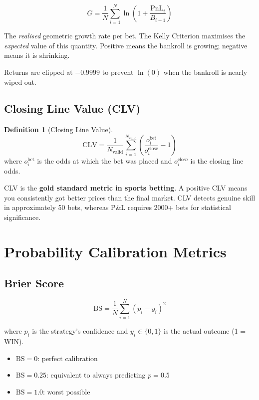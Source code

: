 \documentclass[12pt,a4paper]{report}
\theoremstyle{definition}
\newtheorem{definition}{Definition}[chapter]
\newcommand{\pnl}{\text{PnL}}
\begin{document}
\begin{equation}
    G = \frac{1}{N} \sum_{i=1}^{N} \ln\!\left(1 + \frac{\pnl_i}{B_{i-1}}\right)
    \label{eq:kelly-growth}
\end{equation}

The \emph{realised} geometric growth rate per bet. The Kelly Criterion maximises the \emph{expected} value of this quantity. Positive means the bankroll is growing; negative means it is shrinking.

Returns are clipped at $-0.9999$ to prevent $\ln(0)$ when the bankroll is nearly wiped out.

\subsection{Closing Line Value (CLV)}
\label{sec:clv}

\begin{definition}[Closing Line Value]
\begin{equation}
    \text{CLV} = \frac{1}{N_{\text{valid}}} \sum_{i=1}^{N_{\text{valid}}} \left(\frac{o_i^{\text{bet}}}{o_i^{\text{close}}} - 1\right)
    \label{eq:clv}
\end{equation}
where $o_i^{\text{bet}}$ is the odds at which the bet was placed and $o_i^{\text{close}}$ is the closing line odds.
\end{definition}

CLV is the \textbf{gold standard metric in sports betting}. A positive CLV means you consistently got better prices than the final market. CLV detects genuine skill in approximately 50 bets, whereas P\&L requires 2000+ bets for statistical significance.

\section{Probability Calibration Metrics}

\subsection{Brier Score}
\label{sec:brier}

\begin{equation}
    \text{BS} = \frac{1}{N} \sum_{i=1}^{N} (p_i - y_i)^2
    \label{eq:brier}
\end{equation}

where $p_i$ is the strategy's confidence and $y_i \in \{0, 1\}$ is the actual outcome (1 = WIN).

\begin{itemize}
    \item $\text{BS} = 0$: perfect calibration
    \item $\text{BS} = 0.25$: equivalent to always predicting $p = 0.5$
    \item $\text{BS} = 1.0$: worst possible
\end{itemize}
\end{document}
